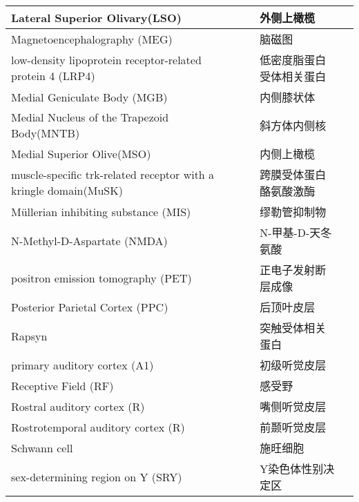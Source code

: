 \begin{table}[htbp]
{\begin{tabular}{llll}
		\midrule
		Lateral Superior Olivary(LSO)   && 外侧上橄榄  \\
		
			
		\midrule
		Magnetoencephalography (MEG)   && 脑磁图  \\
		
		\midrule
		low-density lipoprotein receptor-related protein 4 (LRP4)   && 低密度脂蛋白受体相关蛋白  \\
		
		\midrule
		Medial Geniculate Body (MGB)   && 内侧膝状体  \\
		
		\midrule
		Medial Nucleus of the Trapezoid Body(MNTB)   && 斜方体内侧核  \\
		
		\midrule
		Medial Superior 		Olive(MSO)   && 内侧上橄榄  \\
		
		\midrule
		muscle-specific trk-related receptor with a
		kringle domain(MuSK)   && 跨膜受体蛋白酪氨酸激酶  \\
		
		\midrule
		Müllerian inhibiting substance (MIS)   && 缪勒管抑制物  \\
		
		\midrule
		N-Methyl-D-Aspartate (NMDA)   && N-甲基-D-天冬氨酸  \\
		
		\midrule
		positron emission tomography (PET)     && 正电子发射断层成像   \\
		
		\midrule
		Posterior Parietal Cortex (PPC)     && 后顶叶皮层   \\
		
		\midrule
		Rapsyn   && 突触受体相关蛋白  \\
		
		\midrule
		primary auditory cortex (A1)   && 初级听觉皮层  \\
		
		\midrule
		Receptive Field (RF)   && 感受野  \\
		
		\midrule
		Rostral auditory cortex (R)   && 嘴侧听觉皮层  \\
		
		\midrule
		Rostrotemporal auditory cortex (R)   && 前颞听觉皮层 \\
		
		\midrule
		Schwann cell   && 施旺细胞 \\
		
		\midrule
		sex-determining region on Y (SRY)   && Y染色体性别决定区 \\
		

\end{tabular}}
\end{table}
